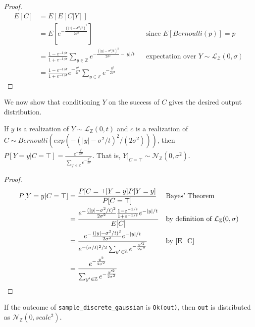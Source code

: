 \documentclass{article}
\begin{document}
\begin{proof}
    \begin{align*}
        E[C] &= E[E[C|Y]] \\
        &= E[e^{-\frac{(|Y| - \sigma^2/t)^2}{2\sigma^2}}] && \text{since } E[Bernoulli(p)] = p \\
        &= \frac{1 - e^{-1/\sigma}}{1 + e^{-1/\sigma}} \sum_{y\in \mathbb{Z}} e^{-\frac{(|y| - \sigma^2/t)^2}{2\sigma^2} - |y|/t} && \text{expectation over } Y \sim \mathcal{L}_\mathcal{Z}(0, \sigma) \\
        &= \frac{1 - e^{-1/\sigma}}{1 + e^{-1/\sigma}}e^{-\frac{\sigma^2}{2t^2}} \sum_{y\in \mathbb{Z}} e^{-\frac{y^2}{2\sigma^2}}
    \end{align*}
\end{proof}

We now show that conditioning $Y$ on the success of $C$ gives the desired output distribution.
\begin{theorem}\cite{CKS20}
    \label{P_Yy_CT} If $y$ is a realization of $Y \sim \mathcal{L}_\mathbb{Z}(0, t)$ and $c$ is a realization of $C \sim Bernoulli(exp(-(|y| - \sigma^2 / t)^2 / (2 \sigma^2)))$, then
    $P[Y=y | C=\top] = \frac{e^{-\frac{y^2}{2\sigma^2}}}{\sum_{y' \in \mathbb{Z}} e^{-\frac{y'^2}{2\sigma^2}}}$. That is, $Y|_{C=\top} \sim \mathcal{N}_\mathbb{Z}(0, \sigma^2)$.
\end{theorem}

\begin{proof}
    \begin{align*}
        P[Y=y | C=\top] &= \frac{P[C=\top|Y=y]P[Y=y]}{P[C=\top]} && \text{Bayes' Theorem} \\
        &= \frac{e^-\frac{(|y| - \sigma^2/t)^2}{2\sigma^2} \frac{1 - e^{-1/t}}{1 + e^{-1/t}} e^{-|y|/t}}{E[C]} && \text{by definition of } \mathcal{L}_\mathbb{Z}(0, \sigma) \\
        &= \frac{e^-\frac{(|y| - \sigma^2/t)^2}{2\sigma^2} e^{-|y|/t}}{e^{-(\sigma/t)^2/2} \sum_{y' \in \mathbb{Z}} e^{-\frac{y'^2}{2\sigma^2}}} && \text{by } \ref{E_C}\\
        &= \frac{e^{-\frac{y^2}{2\sigma^2}}}{\sum_{y' \in \mathbb{Z}} e^{-\frac{y'^2}{2\sigma^2}}}
    \end{align*}
\end{proof}

\begin{lemma}\label{ok-out}
    If the outcome of \texttt{sample\_discrete\_gaussian} is \texttt{Ok(out)}, 
    then \texttt{out} is distributed as $\mathcal{N}_\mathbb{Z}(0, scale^2)$.
\end{lemma}
\end{document}
